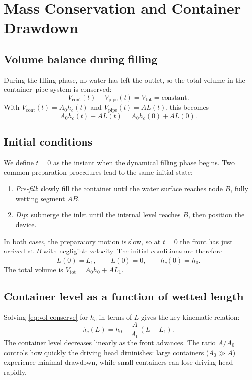 \documentclass[11pt]{article}
\theoremstyle{definition}
\begin{document}
\section{Mass Conservation and Container Drawdown}
\label{sec:conservation}

\subsection{Volume balance during filling}

During the filling phase, no water has left the outlet, so the total volume in the 
container--pipe system is conserved:
\begin{equation}
  V_{\text{cont}}(t) + V_{\text{pipe}}(t) = V_{\text{tot}} = \text{constant}.
  \label{eq:vol-conserve}
\end{equation}
With $V_{\text{cont}}(t) = A_0 h_c(t)$ and $V_{\text{pipe}}(t) = A L(t)$, this becomes
\[
  A_0 h_c(t) + A L(t) = A_0 h_c(0) + A L(0).
\]

\subsection{Initial conditions}
\label{sec:ICs}

We define $t = 0$ as the instant when the dynamical filling phase begins. Two common 
preparation procedures lead to the same initial state:
\begin{enumerate}[nosep]
  \item \emph{Pre-fill}: slowly fill the container until the water surface reaches node $B$, 
        fully wetting segment $AB$.
  \item \emph{Dip}: submerge the inlet until the internal level reaches $B$, then position 
        the device.
\end{enumerate}
In both cases, the preparatory motion is slow, so at $t = 0$ the front has just arrived at 
$B$ with negligible velocity. The initial conditions are therefore
\begin{equation}
  \boxed{L(0) = L_1, \qquad \dot{L}(0) = 0, \qquad h_c(0) = h_0.}
  \label{eq:ICs}
\end{equation}
The total volume is $V_{\text{tot}} = A_0 h_0 + A L_1$.

\subsection{Container level as a function of wetted length}

Solving \eqref{eq:vol-conserve} for $h_c$ in terms of $L$ gives the key kinematic relation:
\begin{equation}
  \boxed{h_c(L) = h_0 - \frac{A}{A_0}(L - L_1).}
  \label{eq:hc-of-L}
\end{equation}
The container level decreases linearly as the front advances. The ratio $A/A_0$ controls 
how quickly the driving head diminishes: large containers ($A_0 \gg A$) experience minimal 
drawdown, while small containers can lose driving head rapidly.
\end{document}
